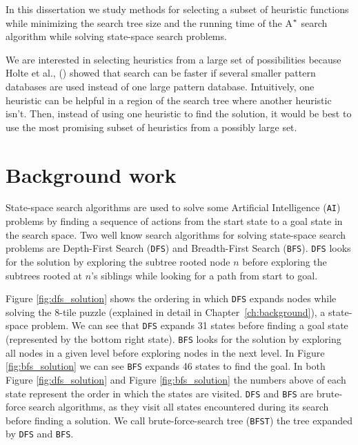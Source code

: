 In this dissertation we study methods for selecting a subset of heuristic functions while minimizing the search tree size and the running time of the A$\sp{*}$ \cite{hart1968formal} search algorithm while solving state-space search problems.

We are interested in selecting heuristics from a large set of possibilities because Holte et al., (\citeyear{holte2006maximizing}) showed that search can be faster if several smaller pattern databases are used instead of one large pattern database. %
Intuitively, one heuristic can be helpful in a region of the search tree where another heuristic isn't. Then, instead of using one heuristic to find the solution, it would be best to use the most promising subset of heuristics from a possibly large set.

\section{Background work}
\noindent
State-space search algorithms are used to solve some Artificial Intelligence (\texttt{AI}) problems by finding a sequence of actions from the start state to a goal state in the search space. Two well know search algorithms for solving state-space search problems are Depth-First Search (\texttt{DFS}) and Breadth-First Search (\texttt{BFS}). \texttt{DFS} looks for the solution by exploring the subtree rooted node $n$ before exploring the subtrees rooted at $n$'s siblings while looking for a path from start to goal. 

Figure \ref{fig:dfs_solution} shows the ordering in which \texttt{DFS} expands nodes while solving the 8-tile puzzle (explained in detail in Chapter~\ref{ch:background}), a state-space problem. We can see that \texttt{DFS} expands 31 states before finding a goal state (represented by the bottom right state). \texttt{BFS} looks for the solution by exploring all nodes in a given level before exploring nodes in the next level. In Figure \ref{fig:bfs_solution} we can see \texttt{BFS} expands 46 states to find the goal. In both Figure \ref{fig:dfs_solution} and Figure \ref{fig:bfs_solution} the numbers above of each state represent the order in which the states are visited. \texttt{DFS} and \texttt{BFS} are brute-force search algorithms, as they visit all states encountered during its search before finding a solution. %
We call brute-force-search tree (\texttt{BFST}) the tree expanded by \texttt{DFS} and \texttt{BFS}.

